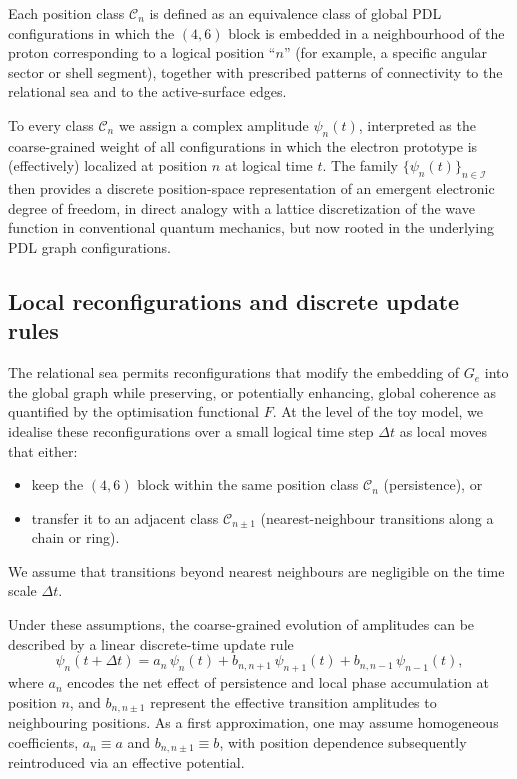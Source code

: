 \documentclass[11pt,a4paper]{article}
\begin{document}
Each position class $\mathcal{C}_{n}$ is defined as an equivalence class of global PDL configurations in which the $(4,6)$ block is embedded in a neighbourhood of the proton corresponding to a logical position ``$n$'' (for example, a specific angular sector or shell segment), together with prescribed patterns of connectivity to the relational sea and to the active-surface edges.\cite{Laubscher2026SchrodingerSketch}

To every class $\mathcal{C}_{n}$ we assign a complex amplitude $\psi_{n}(t)$, interpreted as the coarse-grained weight of all configurations in which the electron prototype is (effectively) localized at position $n$ at logical time $t$.
The family $\{\psi_{n}(t)\}_{n\in\mathcal{I}}$ then provides a discrete position-space representation of an emergent electronic degree of freedom, in direct analogy with a lattice discretization of the wave function in conventional quantum mechanics, but now rooted in the underlying PDL graph configurations.\cite{Laubscher2026SchrodingerPDL}

\subsection{Local reconfigurations and discrete update rules}

The relational sea permits reconfigurations that modify the embedding of $G_{e}$ into the global graph while preserving, or potentially enhancing, global coherence as quantified by the optimisation functional $F$.\cite{Laubscher2026FullPDL}
At the level of the toy model, we idealise these reconfigurations over a small logical time step $\Delta t$ as local moves that either:
\begin{itemize}
  \item keep the $(4,6)$ block within the same position class $\mathcal{C}_{n}$ (persistence), or
  \item transfer it to an adjacent class $\mathcal{C}_{n\pm 1}$ (nearest-neighbour transitions along a chain or ring).
\end{itemize}
We assume that transitions beyond nearest neighbours are negligible on the time scale $\Delta t$.

Under these assumptions, the coarse-grained evolution of amplitudes can be described by a linear discrete-time update rule
\begin{equation}
\psi_{n}(t+\Delta t)
= a_{n}\,\psi_{n}(t) + b_{n,n+1}\,\psi_{n+1}(t) + b_{n,n-1}\,\psi_{n-1}(t),
\label{eq:discreteUpdateGeneral}
\end{equation}
where $a_{n}$ encodes the net effect of persistence and local phase accumulation at position $n$, and $b_{n,n\pm 1}$ represent the effective transition amplitudes to neighbouring positions.\cite{Laubscher2026SchrodingerSketch}
As a first approximation, one may assume homogeneous coefficients, $a_{n}\equiv a$ and $b_{n,n\pm 1}\equiv b$, with position dependence subsequently reintroduced via an effective potential.
\end{document}
